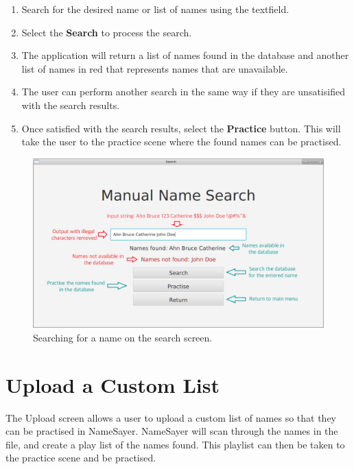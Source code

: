 \documentclass{article}
\begin{document}
\begin{enumerate}
	\item Search for the desired name or list of names using the textfield.

	\item Select the \textbf{Search} to process the search.

	\item The application will return a list of names found in the database and
	another list of names in red that represents names that are unavailable.

	\item The user can perform another search in the same way if they are
	unsatisified with the search results.

	\item Once satisfied with the search results, select the \textbf{Practice}
	button. This will take the user to the practice scene where the found names
	can be practised.

\end{enumerate}

\begin{figure}[H]
	\includegraphics[width=\textwidth]{images/4_search.jpg}
	\caption{Searching for a name on the search screen.}
	\label{search}
\end{figure}

\section{Upload a Custom List}
The Upload screen allows a user to upload a custom list of names so that they
can be practised in NameSayer.  NameSayer will scan through the names in the
file, and create a play list of the names found. This playlist can then be taken
to the practice scene and be practised.
\end{document}

